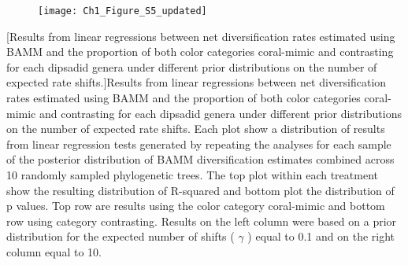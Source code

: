 \begin{figure}[h]
	\centering
	\texttt{[image: Ch1\_Figure\_S5\_updated]}
\end{figure}
\clearpage %
[Results from linear regressions between net diversification rates estimated using BAMM and the proportion of both color categories coral-mimic and contrasting for each dipsadid genera under different prior distributions on the number of expected rate shifts.]{Results from linear regressions between net diversification rates estimated using BAMM and the proportion of both color categories coral-mimic and contrasting for each dipsadid genera under different prior distributions on the number of expected rate shifts. Each plot show a distribution of results from linear regression tests generated by repeating the analyses for each sample of the posterior distribution of BAMM diversification estimates combined across 10 randomly sampled phylogenetic trees. The top plot within each treatment show the resulting distribution of R-squared and bottom plot the distribution of p values. Top row are results using the color category coral-mimic and bottom row using category contrasting. Results on the left column were based on a prior distribution for the expected number of shifts ( $\gamma$ ) equal to 0.1 and on the right column equal to 10.}
\label{fig:prior_linear_BAMM} %